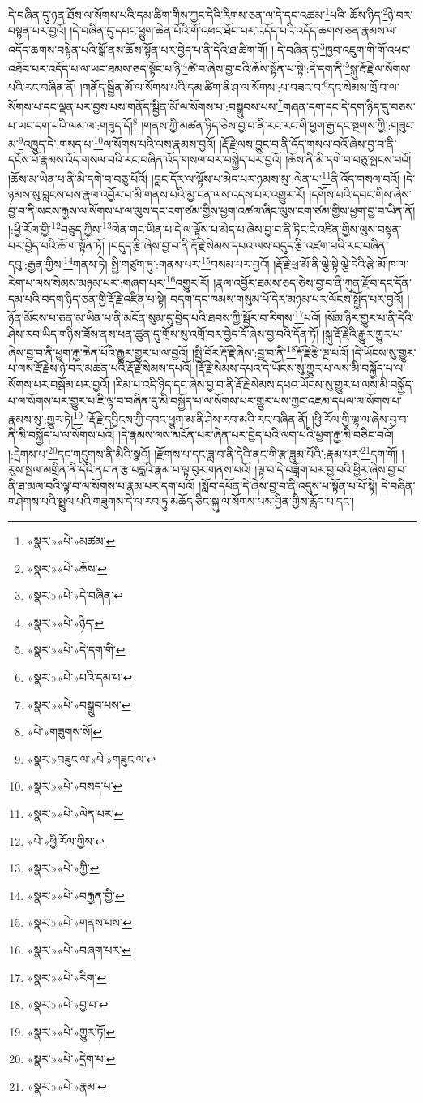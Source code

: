 དེ་བཞིན་དུ་ཉན་ཐོས་ལ་སོགས་པའི་དམ་ཚིག་གིས་ཀྱང་དེའི་རིགས་ཅན་ལ་དེ་དང་འཚམ་\footnote{«སྣར་»«པེ་»མཚམ་}པའི་:ཆོས་ཉིད་\footnote{«སྣར་»«པེ་»ཆོས་}ཉེ་བར་བསྟན་པར་བྱའོ། །དེ་བཞིན་དུ་དབང་ཕྱུག་ཆེན་པོའི་གོ་འཕང་ཐོབ་པར་འདོད་པའི་འདོད་ཆགས་ཅན་རྣམས་ལ་འདོད་ཆགས་བསྟེན་པའི་སྒོ་ནས་ཆོས་སྟོན་པར་བྱེད་པ་ནི་དེའི་ཐ་ཚིག་གོ། །:དེ་བཞིན་དུ་\footnote{«སྣར་»«པེ་»དེ་བཞིན་}ཁྱབ་འཇུག་གི་གོ་འཕང་འཐོབ་པར་འདོད་པ་ལ་ཡང་ཐམས་ཅད་སྟོང་པ་ཉི་\footnote{«སྣར་»«པེ་»ཉིད་}ཚེ་བ་ཞེས་བྱ་བའི་ཆོས་སྟོན་པ་སྟེ་:དེ་དག་ནི་\footnote{«སྣར་»«པེ་»དེ་དག་གི་}སྐུ་རྡོ་རྗེ་ལ་སོགས་པའི་རང་བཞིན་ནོ། །གནོད་སྦྱིན་མོ་ལ་སོགས་པའི་དམ་ཚིག་ནི་ཤ་ལ་སོགས་:པ་བཟའ་བ་\footnote{«སྣར་»«པེ་»པའི་དམ་པ་}དང་སེམས་ཁྲོ་བ་ལ་སོགས་པ་དང་ལྡན་པར་བྱས་པས་གནོད་སྦྱིན་མོ་ལ་སོགས་པ་:བསྒྲུབས་པས་\footnote{«སྣར་»«པེ་»བསྒྲུབ་པས་}གཞན་དག་དང་དེ་དག་ཉིད་དུ་བཅས་པ་ཡང་དག་པའི་ལམ་ལ་:གཟུད་དོ།\footnote{«པེ་»གཟུགས་སོ།} །གནས་ཀྱི་མཚན་ཉིད་ཅེས་བྱ་བ་ནི་རང་རང་གི་ཕྱག་རྒྱ་དང་སྔགས་ཀྱི་:གཟུང་མ་\footnote{«སྣར་»བཟུང་ལ་«པེ་»གཟུང་ལ་}འཁྱུད་དེ་:གསད་པ་\footnote{«སྣར་»«པེ་»བསད་པ་}ལ་སོགས་པའི་ལས་རྣམས་བྱའོ། །རྡོ་རྗེ་ལས་བྱུང་བ་ནི་འོད་གསལ་བའོ་ཞེས་བྱ་བ་ནི་དངོས་པོ་རྣམས་འོད་གསལ་བའི་རང་བཞིན་འོད་གསལ་བར་བསྐྱེད་པར་བྱའོ། །ཆོས་ནི་མི་དགེ་བ་བཅུ་སྤངས་པའོ། །ཆོས་མ་ཡིན་པ་ནི་མི་དགེ་བ་བཅུ་པོའོ། །བླང་དོར་ལ་ལྟོས་པ་མེད་པར་ཉམས་སུ་:ལེན་པ་\footnote{«སྣར་»«པེ་»ལེན་པར་}ནི་འོད་གསལ་བའོ། །དེ་ཉམས་སུ་བླངས་པས་རྣལ་འབྱོར་པ་མི་གནས་པའི་མྱ་ངན་ལས་འདས་པར་འགྱུར་རོ། །དགོས་པའི་དབང་གིས་ཞེས་བྱ་བ་ནི་སངས་རྒྱས་ལ་སོགས་པ་ལ་ལུས་དང་ངག་ཙམ་གྱིས་ཕྱག་འཚལ་ཞིང་ལུས་ངག་ཙམ་གྱིས་ཕྱག་བྱ་བ་ཡིན་ནོ། །:ཕྱི་རོལ་གྱི་\footnote{«པེ་»ཕྱི་རོལ་གྱིས་}བཅུད་ཀྱིས་\footnote{«སྣར་»«པེ་»ཀྱི་}ལེན་གང་ཡིན་པ་དེ་ལ་ལྟོས་པ་མེད་པ་ཞེས་བྱ་བ་ནི་ཏིང་ངེ་འཛིན་གྱིས་ལུས་བསྟན་པར་བྱེད་པའི་ཆོ་ག་སྟོན་ཏོ། །བདུད་རྩི་ཞེས་བྱ་བ་ནི་རྡོ་རྗེ་སེམས་དཔའ་ལས་བདུད་རྩི་འཛག་པའི་རང་བཞིན་དབུ་:རྒྱན་གྱིས་\footnote{«སྣར་»«པེ་»བརྒྱན་གྱི་}གནས་ཏེ། སྤྱི་གཙུག་ཏུ་:གནས་པར་\footnote{«སྣར་»«པེ་»གནས་པས་}བསམ་པར་བྱའོ། །རྡོ་རྗེ་ཕྲ་མོ་ནི་ལྕེ་སྟེ་ལྕེ་དེའི་རྩེ་མོ་ཁ་ལ་རེག་པ་ལས་སེམས་མཉམ་པར་:གཞག་པར་\footnote{«སྣར་»«པེ་»བཞག་པར་}འགྱུར་རོ། །རྣལ་འབྱོར་ཐམས་ཅད་ཅེས་བྱ་བ་ནི་ཀུན་རྫོབ་དང་དོན་དམ་པའི་བདག་ཉིད་ཅན་གྱི་རྡོ་རྗེ་འཛིན་པ་སྟེ། བདག་དང་ཁམས་གསུམ་པོ་དེར་མཉམ་པར་ལོངས་སྤྱོད་པར་བྱའོ། །ཉོན་མོངས་པ་ཅན་མ་ཡིན་པ་ནི་མངོན་སུམ་དུ་བྱེད་པའི་ཐབས་ཀྱི་སྦྱོར་བ་རིགས་\footnote{«སྣར་»«པེ་»རིག་}པའོ། །སོམ་ཉིར་གྱུར་པ་ནི་དེའི་ཤེས་རབ་ཡིད་གཉིས་ཟོས་ནས་ཕན་ཚུན་དུ་གྲོས་སུ་འགྲོ་བར་བྱེད་དོ་ཞེས་བྱ་བའི་དོན་ཏོ། །སྐུ་རྡོ་རྗེའི་རྒྱུར་གྱུར་པ་ཞེས་བྱ་བ་ནི་ཕྱག་རྒྱ་ཆེན་པོའི་རྒྱུར་གྱུར་པ་ལ་བྱའོ། །སྤྱི་བོར་རྡོ་རྗེ་ཞེས་:བྱ་བ་ནི་\footnote{«སྣར་»«པེ་»བྱ་བ་}རྡོ་རྗེ་རྩེ་ལྔ་པའོ། །དེ་ཡོངས་སུ་གྱུར་པ་ལས་རྡོ་རྗེས་ཉེ་བར་མཚན་པའི་རྡོ་རྗེ་སེམས་དཔའོ། །རྡོ་རྗེ་སེམས་དཔའ་དེ་ཡོངས་སུ་གྱུར་པ་ལས་མི་བསྐྱོད་པ་ལ་སོགས་པར་བསྒོམ་པར་བྱའོ། །རིམ་པ་འདི་ཉིད་དང་ཞེས་བྱ་བ་ནི་རྡོ་རྗེ་སེམས་དཔའ་ཡོངས་སུ་གྱུར་པ་ལས་མི་བསྐྱོད་པ་ལ་སོགས་པར་གྱུར་པ་ཇི་ལྟ་བ་བཞིན་དུ་མི་བསྐྱོད་པ་ལ་སོགས་པར་གྱུར་པས་ཀྱང་འཇམ་དཔལ་ལ་སོགས་པ་རྣམས་སུ་:གྱུར་ཏེ།\footnote{«སྣར་»«པེ་»གྱུར་ཏོ།} །རྡོ་རྗེ་དབྱིངས་ཀྱི་དབང་ཕྱུག་མ་ནི་ཤེས་རབ་མའི་རང་བཞིན་ནོ། །ཕྱི་རོལ་གྱི་ལྷ་ལ་ཞེས་བྱ་བ་ནི་མི་བསྐྱོད་པ་ལ་སོགས་པའོ། །དེ་རྣམས་ལས་མངོན་པར་ཞེན་པར་བྱེད་པའི་ལག་པའི་ཕྱག་རྒྱ་མི་བཅིང་བའོ། །:དྲེགས་པ་\footnote{«སྣར་»«པེ་»དྲེག་པ་}དང་གདུགས་ནི་མིའི་སྣའོ། །རྫོགས་པ་དང་ཟླ་བ་ནི་དེའི་ནང་གི་རྩ་ཟླུམ་པོའི་:རྣམ་པར་\footnote{«སྣར་»«པེ་»རྣམ་}དག་གོ། །རུས་སྦལ་མགྲིན་ནི་དེའི་ནང་ན་རྩ་པདྨའི་རྣམ་པ་ལྟ་བུར་གནས་པའོ། །ལྟ་བ་དེ་བཟློག་པར་བྱ་བའི་ཕྱིར་ཞེས་བྱ་བ་ནི་ཐ་མལ་བའི་ལྟ་བ་ལ་སོགས་པ་རྣམ་པར་དག་པའོ། །སློབ་དཔོན་དེ་ཞེས་བྱ་བ་ནི་འདུས་པ་སྟོན་པ་པོ་སྟེ། དེ་བཞིན་གཤེགས་པའི་སྤྲུལ་པའི་གཟུགས་དེ་ལ་རབ་ཏུ་མཆོད་ཅིང་སྐུ་ལ་སོགས་པས་བྱིན་གྱིས་རློབ་པ་དང་། 